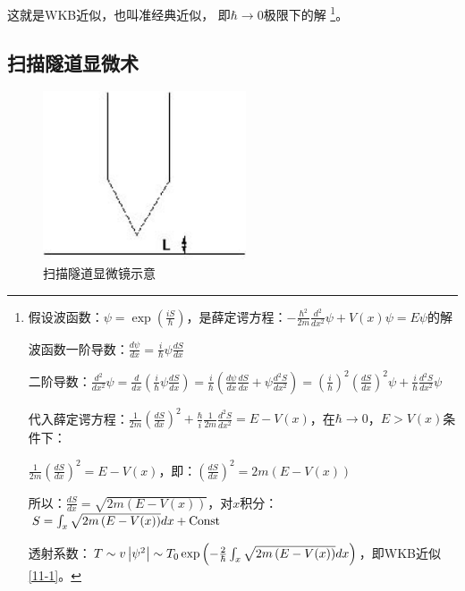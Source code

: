 这就是WKB近似，也叫准经典近似，
即$\hbar  \to 0$极限下的解
\footnote{假设波函数：$\psi  = \exp \left( {\frac{{iS}}{\hbar }} \right)$，是薛定谔方程：$ - \frac{{\hbar ^2 }}{{2m}}\frac{{d^2 }}{{dx^2 }}\psi  + V(x)\psi  = E\psi $的解

波函数一阶导数：$\frac{{d\psi }}{{dx}} = \frac{i}{\hbar }\psi \frac{{dS}}{{dx}}$

二阶导数：$\frac{{d^2 }}{{dx^2 }}\psi  = \frac{d}{{dx}}\left( {\frac{i}{\hbar }\psi \frac{{dS}}{{dx}}} \right) = \frac{i}{\hbar }\left( {\frac{{d\psi }}{{dx}}\frac{{dS}}{{dx}} + \psi \frac{{d^2 S}}{{dx^2 }}} \right) = \left( {\frac{i}{\hbar }} \right)^2 \left( {\frac{{dS}}{{dx}}} \right)^2 \psi  + \frac{i}{\hbar }\frac{{d^2 S}}{{dx^2 }}\psi $

代入薛定谔方程：$\frac{1}{{2m}}\left( {\frac{{dS}}{{dx}}} \right)^2  + \frac{\hbar }{i}\frac{1}{{2m}}\frac{{d^2 S}}{{dx^2 }} = E - V(x)$，在$\hbar  \to 0$，$E > V\left( x \right)$条件下：

$\frac{1}{{2m}}\left( {\frac{{dS}}{{dx}}} \right)^2  = E - V(x)$，即：$\left( {\frac{{dS}}{{dx}}} \right)^2  = 2m\left( {E - V(x)} \right)$

所以：$\frac{{dS}}{{dx}} = \sqrt {2m\left( {E - V(x)} \right)} $，对$x$积分：$S = \int_x {\sqrt {2m\left( {E - V(x)} \right)} dx}  + {\rm{Const}}$

透射系数：$T \sim v\left| {\psi ^2 } \right| \sim T_0 \exp \left( { - {\textstyle{2 \over \hbar }}\int_x {\sqrt {2m\left( {E - V(x)} \right)} dx} } \right)$，即WKB近似\ref{11-1}。
}。

\subsection{扫描隧道显微术}

\begin{figure}[h]
\begin{center}
\includegraphics[clip,width=6cm]{1DProblem/11-5.ps}
\caption{扫描隧道显微镜示意}
\end{center}
\end{figure}

